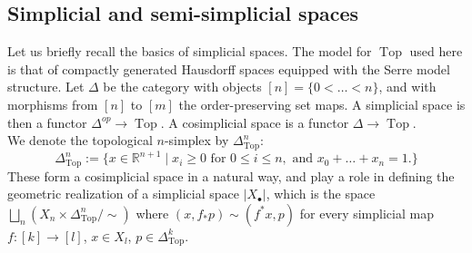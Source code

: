 \documentclass[12pt]{amsart}
\theoremstyle{plain}
\theoremstyle{definition}
\theoremstyle{remark}
\DeclareMathOperator{\Conf}{Conf}
\DeclareMathOperator{\Top}{Top}
\begin{document}

\subsection{Simplicial and semi-simplicial spaces}

Let us briefly recall the basics of simplicial spaces. 
The model for $\Top$ used here is that of compactly generated Hausdorff spaces equipped with the Serre model structure.
Let $\Delta$ be the category with objects $[n] = \{0 < \dots < n\}$, and with morphisms from $[n]$ to $[m]$ the order-preserving set maps.
A simplicial space is then a functor $\Delta^{op}\rightarrow \Top$.
A cosimplicial space is a functor $\Delta \rightarrow \Top$.\\
We denote the topological $n$-simplex by $\Delta^n_{\Top}$:
\[\Delta^n_{\Top} := \{x\in\mathbb{R}^{n+1} \mid x_i \geq 0 \text{ for } 0\leq i\leq n, \text{ and } x_0+\dots +x_n = 1.\}\]
These form a cosimplicial space in a natural way, and play a role in defining the geometric realization of a simplicial space $\vert X_\bullet \vert$, 
which is the space $\bigsqcup_n \left( X_n\times \Delta^n_{\Top}/\sim\right)$ where $(x, f_*p)\sim (f^*x,p)$ for every simplicial map $f:[k]\rightarrow [l]$, $x\in X_l$, $p\in\Delta^k_{\Top}$.
\end{document}
